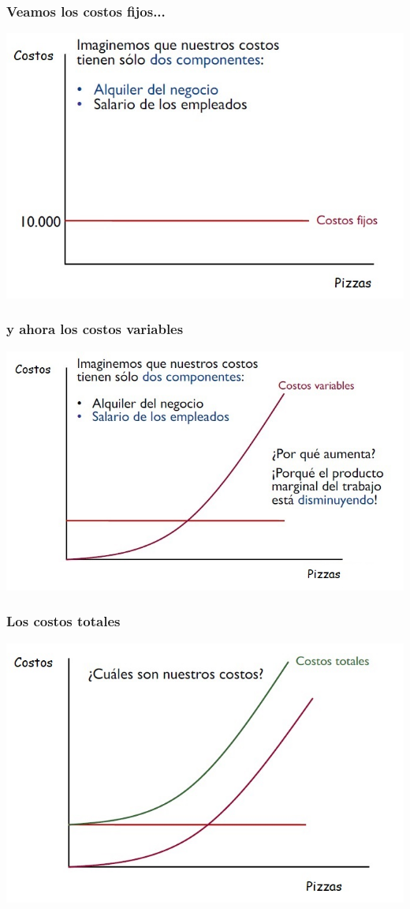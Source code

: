 \documentclass{beamer}
\begin{document}
\begin{frame}
\frametitle{Veamos los costos fijos...}
\centering
\includegraphics[scale=0.6]{Slides Principios de Economia/Figures/Tema_06.17.jpg}
\end{frame}

\begin{frame}
\frametitle{y ahora los costos variables}
\centering
\includegraphics[scale=0.6]{Slides Principios de Economia/Figures/Tema_06.18.jpg}
\end{frame}

\begin{frame}
\frametitle{Los costos totales}
\centering
\includegraphics[scale=0.6]{Slides Principios de Economia/Figures/Tema_06.19.jpg}
\end{frame}
\end{document}
